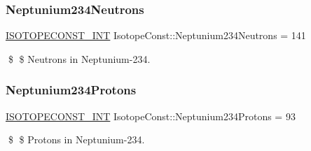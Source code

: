 \subsubsection{\texorpdfstring{Neptunium234\+Neutrons}{Neptunium234Neutrons}}
{\footnotesize\ttfamily \mbox{\hyperlink{group___isotope_const-_macros_ga5f18360b3e99483a35c32d789e62621c}{I\+S\+O\+T\+O\+P\+E\+C\+O\+N\+S\+T\+\_\+\+I\+NT}} Isotope\+Const\+::\+Neptunium234\+Neutrons = 141}

\$ \$ Neutrons in Neptunium-\/234. \mbox{\label{group___isotope_const-_neptunium-_np234_ga88993ad6569d882f5afef5c3e8d510e4}} 
\subsubsection{\texorpdfstring{Neptunium234\+Protons}{Neptunium234Protons}}
{\footnotesize\ttfamily \mbox{\hyperlink{group___isotope_const-_macros_ga5f18360b3e99483a35c32d789e62621c}{I\+S\+O\+T\+O\+P\+E\+C\+O\+N\+S\+T\+\_\+\+I\+NT}} Isotope\+Const\+::\+Neptunium234\+Protons = 93}

\$ \$ Protons in Neptunium-\/234. 